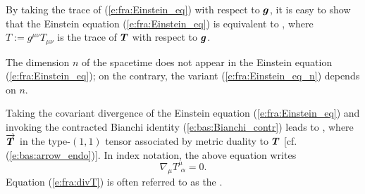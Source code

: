 By taking the trace of (\ref{e:fra:Einstein_eq}) with respect to $\bm{g}$, it is
easy to show that the Einstein equation (\ref{e:fra:Einstein_eq}) is
equivalent to
\be \label{e:fra:Einstein_eq_n}
    ,
\ee
where $T := g^{\mu\nu} T_{\mu\nu}$ is the trace of $\bm{T}$ with respect to
$\bm{g}$.

\begin{remark}
The dimension $n$ of the spacetime does not appear in the Einstein equation
(\ref{e:fra:Einstein_eq}); on the contrary, the variant
(\ref{e:fra:Einstein_eq_n}) depends on $n$.
\end{remark}

Taking the covariant divergence of the Einstein equation (\ref{e:fra:Einstein_eq})
and invoking the contracted Bianchi identity (\ref{e:bas:Bianchi_contr}) leads
to
\be \label{e:fra:divT}
    ,
\ee
where $\overrightarrow{\bm{T}}$ in the type-$(1,1)$ tensor associated by metric duality
to $\bm{T}$ [cf. (\ref{e:bas:arrow_endo})]. In index notation, the above
equation writes
\[
    \nabla_\mu T^\mu_{\ \, \alpha} = 0 .
\]
Equation (\ref{e:fra:divT}) is often referred to as the .



